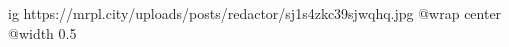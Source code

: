 
 
 
 
 

\ifcmt
  ig https://mrpl.city/uploads/posts/redactor/sj1s4zkc39sjwqhq.jpg
  @wrap center
  @width 0.5
\fi
